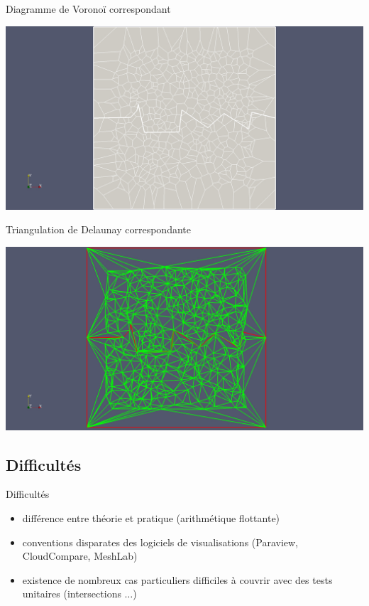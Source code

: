\documentclass[aspectratio=169, 12pt, a4paper, hyperref={pdfauthor={Alexandre MARIN}, pdfkeywords={IFPEN, Delaunay, Voronoi, mesh generation}, colorlinks=true, linkcolor=purple, urlcolor=blue, citecolor=magenta}]{beamer}
\begin{document}
\begin{Energie}{\normalsize Diagramme de Voronoï correspondant}
\begin{center}\vspace{-1cm}
\includegraphics[scale=0.18, viewport=500 0 1700 1300, clip]{extended_vor.jpg}
\end{center}
\end{Energie}

\begin{Energie}{\normalsize Triangulation de Delaunay correspondante}
\begin{center}\vspace{-1cm}
\includegraphics[scale=0.18, viewport=480 0 1630 1300, clip]{interfaceInSquare.jpg}
\end{center}
\end{Energie}

\subsection{Difficultés}

\begin{Energie}{Difficultés}
\begin{itemize}
\item différence entre théorie et pratique (arithmétique flottante)
\item conventions disparates des logiciels de visualisations (Paraview, CloudCompare, MeshLab)
\item existence de nombreux cas particuliers difficiles à couvrir avec des tests unitaires (intersections $\dots$)
\end{itemize}
\end{Energie}
\end{document}
